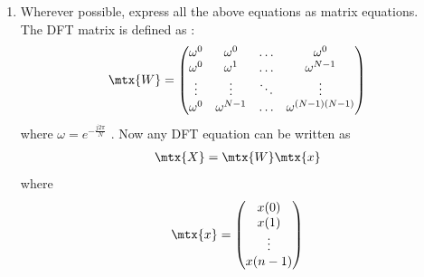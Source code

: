 \documentclass[journal,12pt,twocolumn]{IEEEtran}
\theoremstyle{remark}
\begin{document}
\begin{enumerate}[label=\thesection.\arabic*]
																																																											  \item Wherever possible, express all the above equations as matrix equations.\\
																																																											  \solution The DFT matrix is defined as : 
																																																											  \begin{align}
																																																											  	\mtx{W} = 
																																																													\begin{pmatrix}
																																																															\omega^0 & \omega^0 & \ldots & \omega^0 \\
																																																																	\omega^0 & \omega^1 & \ldots & \omega^{N - 1} \\
																																																																			\vdots & \vdots & \ddots & \vdots \\
																																																																					\omega^0 & \omega^{N - 1} & \ldots & \omega^{(N -1)(N - 1)}
																																																																						\end{pmatrix}
																																																																						\end{align}
																																																																						where $\omega=e^{-\frac{j2\pi}{N}}$ . Now any DFT equation can be written as
																																																																						\begin{align}
																																																																						    \mtx{X} = \mtx{W}\mtx{x}
																																																																						    \end{align}
																																																																						    \noindent where
																																																																						    \begin{align}
																																																																						    	\mtx{x} = 
																																																																								\begin{pmatrix}
																																																																										x(0) \\ x(1) \\ \vdots \\ x(n - 1)

\end{pmatrix}
\end{align}
\end{enumerate}
\end{document}
